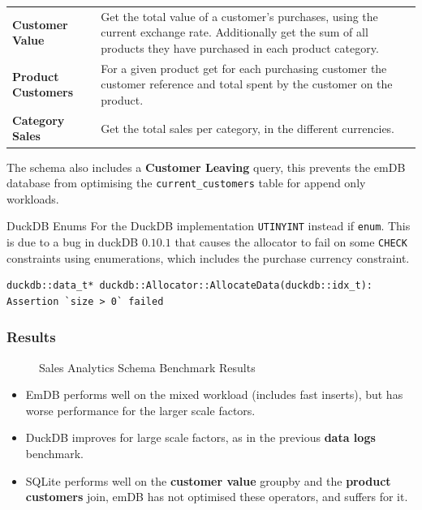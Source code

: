 \begin{center}
    \begin{tabular}{l p{}}
        \textbf{Customer Value} & Get the total value of a customer's purchases, using the current exchange
         rate. Additionally get the sum of all products they have purchased in each product category. \\
        \textbf{Product Customers} & For a given product get for each purchasing customer the customer reference and total spent by the customer on the product. \\
        \textbf{Category Sales}     &  Get the total sales per category, in the different currencies. \\
    \end{tabular}
\end{center}
\noindent
The schema also includes a \textbf{Customer Leaving} query, this prevents the emDB database from optimising the \texttt{current_customers} table for append only workloads.
\begin{notesbox}{DuckDB Enums}
    For the DuckDB implementation \texttt{UTINYINT} instead if \texttt{enum}. This is due to a bug in duckDB $0.10.1$ 
    that causes the allocator to fail on some \texttt{CHECK} constraints using enumerations, which includes the purchase currency constraint.
    \begin{verbatim}
duckdb::data_t* duckdb::Allocator::AllocateData(duckdb::idx_t): Assertion `size > 0` failed
    \end{verbatim}
\end{notesbox}

\subsubsection{Results}
\begin{figure}[h!]
    \centering
    \vspace{-0.4em}
    \resizebox{\textwidth}{!}{}
    \caption{Sales Analytics Schema Benchmark Results}
    \label{fig:sales_analysis_access_queries}
\end{figure}
\begin{itemize}
    \setlength\itemsep{0em}
    \item EmDB performs well on the mixed workload (includes fast inserts), but has worse performance for the larger scale factors.
    \item DuckDB improves for large scale factors, as in the previous \textbf{data logs} benchmark.
    \item SQLite performs well on the \textbf{customer value} groupby and the \textbf{product customers} join, emDB has not optimised these operators, and suffers for it.
\end{itemize}
